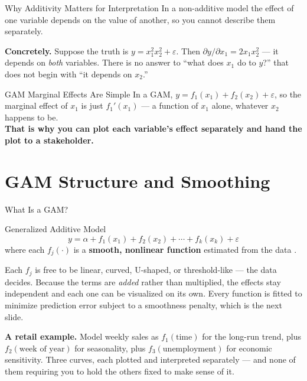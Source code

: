 \documentclass[aspectratio=169, 11pt]{beamer}
\begin{document}
\begin{frame}{Why Additivity Matters for Interpretation}
  In a non-additive model the effect of one variable depends on the value of another, so you
  cannot describe them separately.

  \vspace{0.15cm}
  \textbf{Concretely.} Suppose the truth is $y = x_1^2 x_2^2 + \varepsilon$. Then
  $\partial y / \partial x_1 = 2x_1 x_2^{2}$ --- it depends on \emph{both} variables. There
  is no answer to ``what does $x_1$ do to $y$?'' that does not begin with ``it depends
  on $x_2$.''
  \begin{examplebox}{GAM Marginal Effects Are Simple}
    In a GAM, $y = f_1(x_1) + f_2(x_2) + \varepsilon$, so the marginal effect of $x_1$ is
    just $f_1'(x_1)$ --- a function of $x_1$ alone, whatever $x_2$ happens to be.\\[3pt]
    \textbf{That is why you can plot each variable's effect separately and hand the plot to
    a stakeholder.}
  \end{examplebox}
\end{frame}

\section{GAM Structure and Smoothing}


\begin{frame}{What Is a GAM?}
  \begin{definitionbox}{Generalized Additive Model}
    \vspace{-4pt}
    \[
      y = \alpha + f_1(x_1) + f_2(x_2) + \cdots + f_k(x_k) + \varepsilon
    \]
    \vspace{-6pt}
    \small where each $f_j(\cdot)$ is a \textbf{smooth, nonlinear function} estimated from
    the data \parencite{Wood2017}.
  \end{definitionbox}
  Each $f_j$ is free to be linear, curved, U-shaped, or threshold-like --- the data decides.
  Because the terms are \emph{added} rather than multiplied, the effects stay independent
  and each one can be visualized on its own. Every function is fitted to minimize prediction
  error subject to a smoothness penalty, which is the next slide.

  \vspace{0.2cm}
  \textbf{A retail example.} Model weekly sales as
  $f_1(\text{time})$ for the long-run trend, plus $f_2(\text{week of year})$ for
  seasonality, plus $f_3(\text{unemployment})$ for economic sensitivity. Three curves, each
  plotted and interpreted separately --- and none of them requiring you to hold the others
  fixed to make sense of it.
\end{frame}
\end{document}
